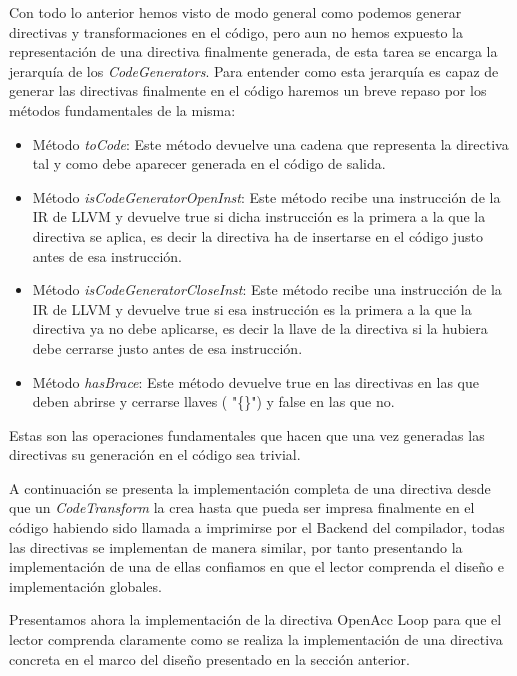 Con todo lo anterior hemos visto de modo general como podemos generar directivas y transformaciones en el código, pero aun no hemos expuesto la representación de una directiva finalmente generada, de esta tarea se encarga la jerarquía de los \textit{CodeGenerators}. Para entender como esta jerarquía es capaz de generar las directivas finalmente en el código haremos un breve repaso por los métodos fundamentales de la misma:

\begin{itemize}

\item Método \textit{toCode}: Este método devuelve una cadena que representa la directiva tal y como debe aparecer generada en el código de salida.

\item Método \textit{isCodeGeneratorOpenInst}: Este método recibe una instrucción de la IR de LLVM y devuelve true si dicha instrucción es la primera a la que la directiva se aplica, es decir la directiva ha de insertarse en el código justo antes de esa instrucción.

\item Método \textit{isCodeGeneratorCloseInst}: Este método recibe una instrucción de la IR de LLVM y devuelve true si esa instrucción es la primera a la que la directiva ya no debe aplicarse, es decir la llave de la directiva si la hubiera debe cerrarse justo antes de esa instrucción.

\item Método \textit{hasBrace}: Este método devuelve true en las directivas en las que deben abrirse y cerrarse llaves ( "\{\}") y false en las que no.

\end{itemize}

Estas son las operaciones fundamentales que hacen que una vez generadas las directivas su generación en el código sea trivial.

A continuación se presenta la implementación completa de una directiva desde que un \textit{CodeTransform} la crea hasta que pueda ser impresa finalmente en el código habiendo sido llamada a imprimirse por el Backend del compilador, todas las directivas se implementan de manera similar, por tanto presentando la implementación de una de ellas confiamos en que el lector comprenda el diseño e implementación globales.

Presentamos ahora la implementación de la directiva OpenAcc Loop para que el lector comprenda claramente como se realiza la implementación de una directiva concreta en el marco del diseño presentado en la sección anterior.

